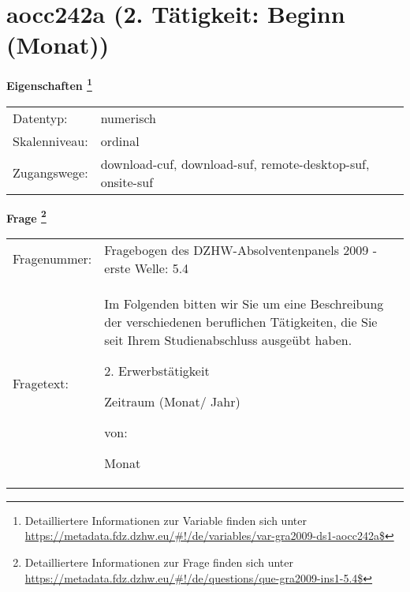 
    \setcounter{footnote}{0}

    \vspace*{-1.8cm}
	\section{aocc242a (2. Tätigkeit: Beginn (Monat))}
	\label{section:aocc242a}



    \vspace*{0.5cm}
    \noindent\textbf{Eigenschaften
	\footnote{Detailliertere Informationen zur Variable finden sich unter
		\url{https://metadata.fdz.dzhw.eu/\#!/de/variables/var-gra2009-ds1-aocc242a$}}}\\
	\begin{tabularx}{\hsize}{@{}lX}
	Datentyp: & numerisch \\
	Skalenniveau: & ordinal \\
	Zugangswege: &
	  download-cuf, 
	  download-suf, 
	  remote-desktop-suf, 
	  onsite-suf
 \\
    \end{tabularx}



				\vspace*{0.5cm}
                \noindent\textbf{Frage
	                \footnote{Detailliertere Informationen zur Frage finden sich unter
		              \url{https://metadata.fdz.dzhw.eu/\#!/de/questions/que-gra2009-ins1-5.4$}}}\\
				\begin{tabularx}{\hsize}{@{}lX}
					Fragenummer: &
					  Fragebogen des DZHW-Absolventenpanels 2009 - erste Welle:
					  5.4
 \\
					Fragetext: & Im Folgenden bitten wir Sie um eine Beschreibung der verschiedenen beruflichen Tätigkeiten, die Sie seit Ihrem Studienabschluss ausgeübt haben.\par  2. Erwerbstätigkeit\par  Zeitraum (Monat/ Jahr)\par  von:\par  Monat \\
				\end{tabularx}





